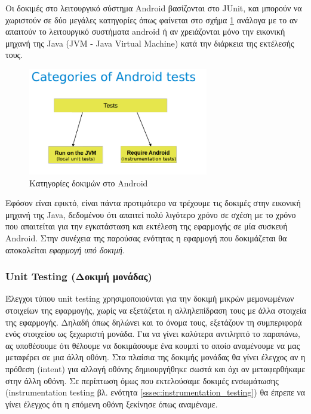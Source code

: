	Οι δοκιμές στο λειτουργικό σύστημα Android βασίζονται στο JUnit, και μπορούν να χωριστούν σε δύο μεγάλες κατηγορίες όπως φαίνεται στο σχήμα \ref{fig:categories_of_android_tests} ανάλογα με το αν απαιτούν το λειτουργικό συστήματα android ή αν χρειάζονται μόνο την εικονική μηχανή της Java (JVM - Java Virtual Machine) κατά την διάρκεια της εκτέλεσής τους\cite{androidTesting}.
	
	\begin{figure}[h]
	    \centering
	    \includegraphics[width=0.7\textwidth]{categories_of_android_tests.png}
	    \caption{ Κατηγορίες δοκιμών στο Android}
	    \label{fig:categories_of_android_tests}
	\end{figure}
	
	Εφόσον είναι εφικτό, είναι πάντα προτιμότερο να τρέχουμε τις δοκιμές στην εικονική μηχανή της Java, δεδομένου ότι απαιτεί πολύ λιγότερο χρόνο σε σχέση με το χρόνο που απαιτείται για την εγκατάσταση και εκτέλεση της εφαρμογής σε μία συσκευή Android. Στην συνέχεια της παρούσας ενότητας η εφαρμογή που δοκιμάζεται θα αποκαλείται \textit{εφαρμογή υπό δοκιμή}.
	
		\subsubsection{Unit Testing (Δοκιμή μονάδας)}
		Έλεγχοι τύπου unit testing χρησιμοποιούνται για την δοκιμή μικρών μεμονωμένων στοιχείων της εφαρμογής, χωρίς να εξετάζεται η αλληλεπίδραση τους με άλλα στοιχεία της εφαρμογής. Δηλαδή όπως δηλώνει και το όνομα τους, εξετάζουν τη συμπεριφορά ενός στοιχείου ως ξεχωριστή μονάδα. Για να γίνει καλύτερα αντιληπτό το παραπάνω, ας υποθέσουμε ότι θέλουμε να δοκιμάσουμε ένα κουμπί το οποίο αναμένουμε να μας μεταφέρει σε μια άλλη οθόνη.  Στα πλαίσια της δοκιμής μονάδας θα γίνει έλεγχος αν η πρόθεση (intent) για αλλαγή οθόνης δημιουργήθηκε σωστά και όχι αν μεταφερθήκαμε στην άλλη οθόνη. Σε περίπτωση όμως που εκτελούσαμε δοκιμές ενσωμάτωσης (instrumentation testing βλ. ενότητα \ref{sssec:instrumentation_testing}) θα έπρεπε να γίνει έλεγχος ότι η επόμενη οθόνη ξεκίνησε όπως αναμέναμε.
		
